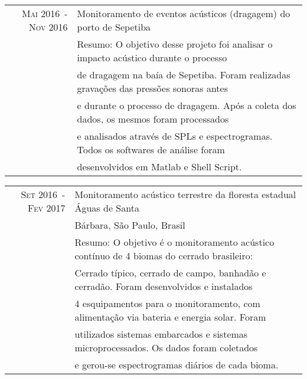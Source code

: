 \documentclass[a4paper,10pt]{article}
\begin{document}
\begin{longtable}{rl}
    \textsc{Mai 2016~-~Nov 2016}    & Monitoramento de eventos acústicos (dragagem) do porto de Sepetiba\\
                                    &\footnotesize{Resumo: O objetivo desse projeto foi analisar o impacto acústico durante o processo}\\
                                    &\footnotesize{de dragagem na baía de Sepetiba. Foram realizadas gravações das pressões sonoras antes}\\
                                    &\footnotesize{e durante o processo de dragagem. Após a coleta dos dados, os mesmos foram processados}\\ 
                                    &\footnotesize{e analisados através de SPLs e espectrogramas. Todos os softwares de análise foram }\\
                                    &\footnotesize{desenvolvidos em Matlab e Shell Script.} \\
\end{longtable}

\begin{longtable}{rl}
    \textsc{Set 2016~-~Fev 2017}    & Monitoramento acústico terrestre da floresta estadual Águas de Santa \\
                                    & Bárbara, São Paulo,  Brasil \\
                                    &\footnotesize{Resumo: O objetivo é o monitoramento acústico contínuo de 4 biomas do cerrado brasileiro:}\\ 
                                    &\footnotesize{Cerrado típico, cerrado de campo, banhadão e cerradão. Foram desenvolvidos e instalados}\\ 
                                    &\footnotesize{4 esquipamentos para o monitoramento, com alimentação via bateria e energia solar. Foram}\\
                                    &\footnotesize{utilizados sistemas embarcados e sistemas microprocessados. Os dados foram coletados}\\ 
                                    &\footnotesize{e gerou-se espectrogramas diários de cada bioma.}\\
\end{longtable}
\end{document}
